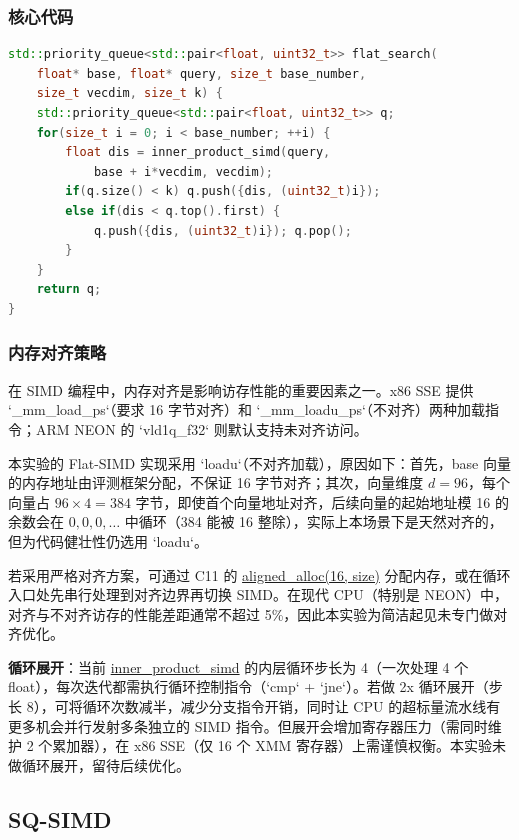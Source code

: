 \documentclass[a4paper]{article}
\begin{document}
\subsubsection{核心代码}

\begin{lstlisting}[language=C++, title=Flat-SIMD 搜索核心]
std::priority_queue<std::pair<float, uint32_t>> flat_search(
    float* base, float* query, size_t base_number,
    size_t vecdim, size_t k) {
    std::priority_queue<std::pair<float, uint32_t>> q;
    for(size_t i = 0; i < base_number; ++i) {
        float dis = inner_product_simd(query,
            base + i*vecdim, vecdim);
        if(q.size() < k) q.push({dis, (uint32_t)i});
        else if(dis < q.top().first) {
            q.push({dis, (uint32_t)i}); q.pop();
        }
    }
    return q;
}
\end{lstlisting}

\subsubsection{内存对齐策略}

在 SIMD 编程中，内存对齐是影响访存性能的重要因素之一。x86 SSE 提供 `_mm_load_ps`（要求 16 字节对齐）和 `_mm_loadu_ps`（不对齐）两种加载指令；ARM NEON 的 `vld1q_f32` 则默认支持未对齐访问。

本实验的 Flat-SIMD 实现采用 `loadu`（不对齐加载），原因如下：首先，base 向量的内存地址由评测框架分配，不保证 16 字节对齐；其次，向量维度 $d=96$，每个向量占 $96 \times 4 = 384$ 字节，即使首个向量地址对齐，后续向量的起始地址模 16 的余数会在 $0, 0, 0, \dots$ 中循环（384 能被 16 整除），实际上本场景下是天然对齐的，但为代码健壮性仍选用 `loadu`。

若采用严格对齐方案，可通过 C11 的 \url{aligned_alloc(16, size)} 分配内存，或在循环入口处先串行处理到对齐边界再切换 SIMD。在现代 CPU（特别是 NEON）中，对齐与不对齐访存的性能差距通常不超过 5\%，因此本实验为简洁起见未专门做对齐优化。

\textbf{循环展开}：当前 \url{inner_product_simd} 的内层循环步长为 4（一次处理 4 个 float），每次迭代都需执行循环控制指令（`cmp` + `jne`）。若做 2x 循环展开（步长 8），可将循环次数减半，减少分支指令开销，同时让 CPU 的超标量流水线有更多机会并行发射多条独立的 SIMD 指令。但展开会增加寄存器压力（需同时维护 2 个累加器），在 x86 SSE（仅 16 个 XMM 寄存器）上需谨慎权衡。本实验未做循环展开，留待后续优化。

\subsection{SQ-SIMD}
\end{document}

